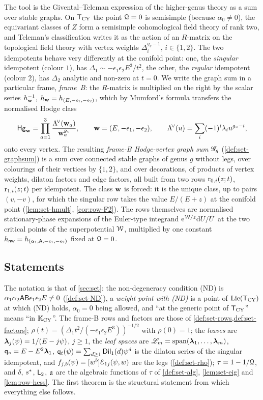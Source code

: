 The tool is the Givental--Teleman expression of the higher-genus theory as a sum over stable graphs. On $\mathsf{T}_{\mathrm{CY}}$ the point $\mathcal{Q}=0$ is semisimple (because $\alpha_0\neq0$), the equivariant classes of $Z$ form a semisimple cohomological field theory of rank two, and Teleman's classification writes it as the action of an $R$-matrix on the topological field theory with vertex weights $\Delta_i^{g_v-1}$, $i\in\{1,2\}$. The two idempotents behave very differently at the conifold point: one, the \emph{singular} idempotent (colour $1$), has $\Delta_1\sim-\epsilon_1\epsilon_2E^3/t^2$, the other, the \emph{regular} idempotent (colour $2$), has $\Delta_2$ analytic and non-zero at $t=0$. We write the graph sum in a particular frame, \emph{frame~B}: the $R$-matrix is multiplied on the right by the scalar series $h_{\mathbf{w}}^{-1}$, $h_{\mathbf{w}}=h_{(E,-\epsilon_1,-\epsilon_2)}$, which by Mumford's formula transfers the normalised Hodge class
\[
\mathsf{Hg}_{\mathbf{w}}=\prod_{a=1}^{3}\frac{\Lambda^{\!\vee}(\mathbf{w}_a)}{\mathbf{w}_a^{g_v}},\qquad \mathbf{w}=(E,-\epsilon_1,-\epsilon_2),\qquad \Lambda^{\!\vee}(u)=\sum_i(-1)^i\lambda_iu^{g_v-i},
\]
onto every vertex. The resulting \emph{frame-B Hodge-vertex graph sum} $\mathscr{G}_g$ (\cref{def:set-graphsum}) is a sum over connected stable graphs of genus $g$ without legs, over colourings of their vertices by $\{1,2\}$, and over decorations, of products of vertex weights, dilaton factors and edge factors, all built from two rows $\mathrm{r}_{0,i}(z;t)$, $\mathrm{r}_{1,i}(z;t)$ per idempotent. The class $\mathbf{w}$ is forced: it is the unique class, up to pairs $(v,-v)$, for which the singular row takes the value $E/(E+z)$ at the conifold point (\cref{lem:set-hmult}, \cref{cor:row-F2}). The rows themselves are normalised stationary-phase expansions of the Euler-type integrand $\mathrm{e}^{\mathcal{W}/z}\mathrm{d} U/U$ at the two critical points of the superpotential $\mathcal{W}$, multiplied by one constant $h_{\mathsf{nw}}=h_{(\alpha_1,\mathsf{A},-\epsilon_1,-\epsilon_2)}$ fixed at $\mathcal{Q}=0$.

\subsection{Statements}
\label{sec:int-statements}

The notation is that of \cref{sec:set}: the non-degeneracy condition (ND) is $\alpha_1\alpha_2\mathsf{A}\mathsf{B}\epsilon_1\epsilon_2E\neq0$ (\cref{def:set-ND}), a \emph{weight point with (ND)} is a point of $\mathrm{Lie}(\mathsf{T}_{\mathrm{CY}})$ at which (ND) holds, $\alpha_0=0$ being allowed, and ``at the generic point of $\mathsf{T}_{\mathrm{CY}}$'' means ``in $\mathbb{K}_{\mathrm{CY}}$''. The frame-B rows and factors are those of \cref{def:set-rows,def:set-factors}; $\rho(t)=(\Delta_1t^2/(-\epsilon_1\epsilon_2E^3))^{-1/2}$ with $\rho(0)=1$; the \emph{leaves} are $\boldsymbol{\lambda}_j(\psi)=1/(E-j\psi)$, $j\geq1$, the \emph{leaf spaces} are $\mathscr{L}_m=\mathrm{span}(\boldsymbol{\lambda}_1,\dots,\boldsymbol{\lambda}_m)$, $\mathsf{q}_{\circ}=E-E^2\boldsymbol{\lambda}_1$, $\mathsf{q}_{t}(\psi)=\sum_{d\geq1}\mathsf{Dil}_1(d)\psi^d$ is the dilaton series of the singular idempotent, and $f_{j,b}(\psi)=[w^b]\mathcal{E}_{1j}(\psi,w)$ are the legs (\cref{def:set-rho}); $\tau=1-1/\mathcal{Q}$, and $\delta$, $s^{\ast}$, $\mathsf{L}_2$, $\mathfrak{a}$ are the algebraic functions of $\tau$ of \cref{def:set-alg}, \cref{lem:set-eig} and \cref{lem:row-hess}. The first theorem is the structural statement from which everything else follows.

